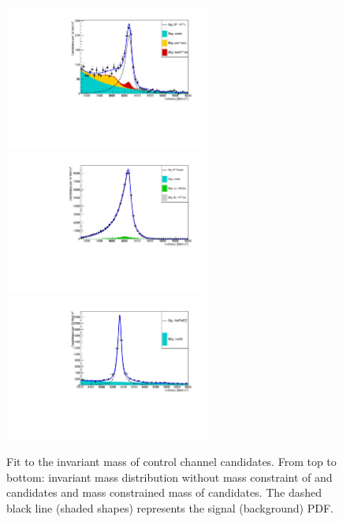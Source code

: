 \begin{figure}[h!]
\centering
\includegraphics[width=0.6\textwidth]{RKst/figs/Fit/fit_EE/fit_G.pdf}
\includegraphics[width=0.6\textwidth]{RKst/figs/Fit/fit_EE/fit_JPs_P.pdf}
\includegraphics[width=0.6\textwidth]{RKst/figs/Fit/fit_EE/fit_Psi.pdf}
\caption{Fit to the \mKpiee invariant mass of control channel candidates.
From top to bottom: invariant mass distribution without mass constraint of \BdToKstGee
and \BdToKstJPsee candidates and mass constrained mass of \BdToKstPsiee candidates.
The dashed black line (shaded shapes) represents the signal (background) PDF.}
\label{fig:fitsControlEE}
\end{figure}

\clearpage

